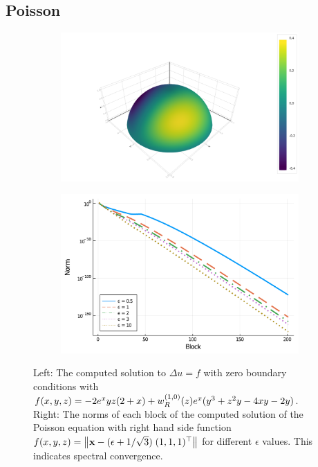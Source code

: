 \documentclass[11pt, oneside]{article}   	%
\begin{document}
\subsection{Poisson}


\begin{figure}[t]
	\begin{subfigure}{0.5\textwidth}
	\includegraphics[scale=0.25]{poisson-u=wyexpx-N=60}
	\centering
	\end{subfigure}
	\begin{subfigure}{0.5\textwidth}
	\centering
	\includegraphics[scale=0.3]{solutionblocknorms-poisson-epsilonfun-N=200}
	\end{subfigure}
	\caption{Left: The computed solution to $\Delta u = f$ with zero boundary conditions with $f(x,y,z) = - 2 e^x y z (2+x) + w_R^{(1,0)}(z) e^x (y^3 + z^2 y - 4xy - 2y)$. Right: The norms of each block of the computed solution of the Poisson equation with right hand side function $f(x,y,z) = \left\| \mathbf{x} - (\epsilon + 1 / \sqrt{3}) \; (1,1,1)^\top  \right\|$ for different $\epsilon$ values. This indicates spectral convergence.}
	\centering
	\label{fig:poisson}
\end{figure}
\end{document}
